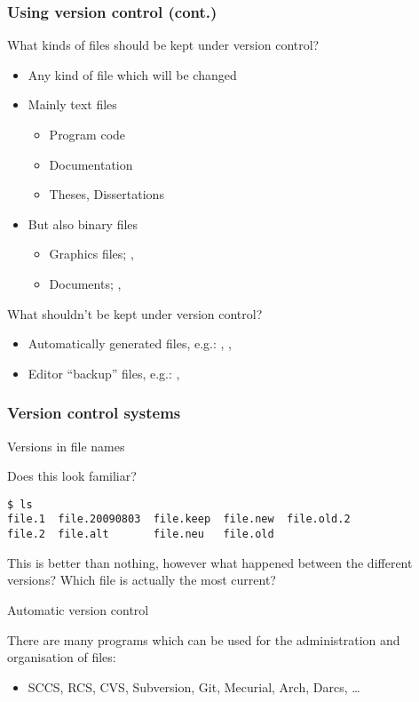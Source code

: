 \begin{frame}
\frametitle{Using version control (cont.)}
{\large \alert{What kinds of files should be kept under version control?}}

\begin{itemize}
\item Any kind of file which will be changed
\item Mainly text files
    \begin{itemize}
    \item Program code
    \item Documentation
    \item Theses, Dissertations
    \end{itemize}
\item But also binary files
    \begin{itemize}
    \item Graphics files; , 
    \item Documents; , 
    \end{itemize}
\end{itemize}

{\large \alert{What shouldn't be kept under version control?}}

\begin{itemize}
\item Automatically generated files, e.g.: , ,
\item Editor \enquote{backup} files, e.g.: , 
\end{itemize}

\end{frame}


\begin{frame}[fragile]
\frametitle{Version control systems}
{\large \alert{Versions in file names}}

Does this look familiar?
\begin{lstlisting}
$ ls
file.1  file.20090803  file.keep  file.new  file.old.2
file.2  file.alt       file.neu   file.old
\end{lstlisting}

This is better than nothing, however what happened between the different
versions?  Which file is actually the most current?

{\large \alert{Automatic version control}}

There are many programs which can be used for the administration and
organisation of files:

\begin{itemize}
\item SCCS, RCS, CVS, Subversion, Git, Mecurial, Arch, Darcs, \ldots
\end{itemize}

\end{frame}


